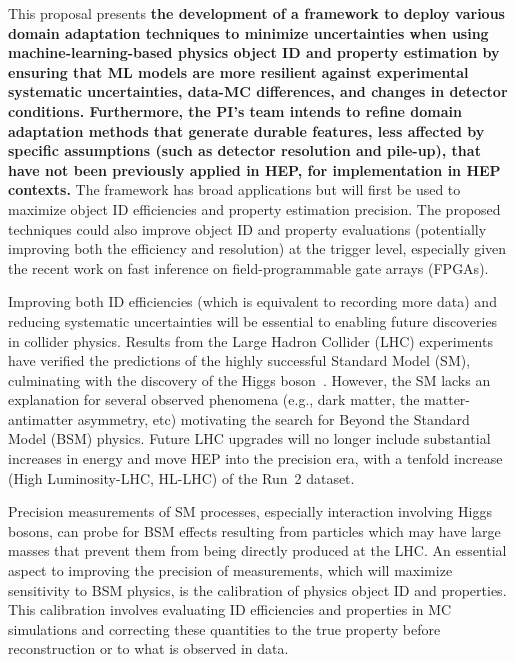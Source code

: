 \documentclass[letter, USenglish, 11pt, subfigure]{article}
\begin{document}
This proposal presents {\bf the development of a framework to deploy various domain adaptation techniques to minimize uncertainties when using machine-learning-based physics object ID and property estimation by ensuring that ML models are more resilient against experimental systematic uncertainties, data-MC differences, and changes in detector conditions. Furthermore, the PI's team intends to refine domain adaptation methods that generate durable features, less affected by specific assumptions (such as detector resolution and pile-up), that have not been previously applied in HEP, for implementation in HEP contexts. } The framework has broad applications but will first be used to maximize object ID efficiencies and property estimation precision. The proposed techniques could also improve object ID and property evaluations (potentially improving both the efficiency and resolution) at the trigger level, especially given the recent work on fast inference on field-programmable gate arrays (FPGAs).

Improving both ID efficiencies (which is equivalent to recording more data) and reducing systematic uncertainties will be essential to enabling future discoveries in collider physics. Results from the Large Hadron Collider (LHC) experiments have verified the predictions of the highly successful Standard Model (SM), culminating with the discovery of the Higgs boson~\cite{HIGG-2012-27,CMS-HIG-12-028}. However, the SM  lacks an explanation for several observed phenomena (e.g., dark matter, the matter-antimatter asymmetry, etc) motivating the search for Beyond the Standard Model (BSM) physics. Future LHC upgrades will no longer include substantial increases in energy and move HEP into the precision era, with a tenfold increase (High Luminosity-LHC, HL-LHC) of the Run~2 dataset. 

Precision measurements of SM processes, especially interaction involving Higgs bosons, can probe for BSM effects resulting from particles which may have large masses that prevent them from being directly produced at the LHC. An essential aspect to improving the precision of measurements, which will maximize sensitivity to BSM physics, is the calibration of physics object ID and properties. This calibration involves evaluating ID efficiencies and properties in MC simulations and correcting these quantities to the true property before reconstruction or to what is observed in data. 
\end{document}
